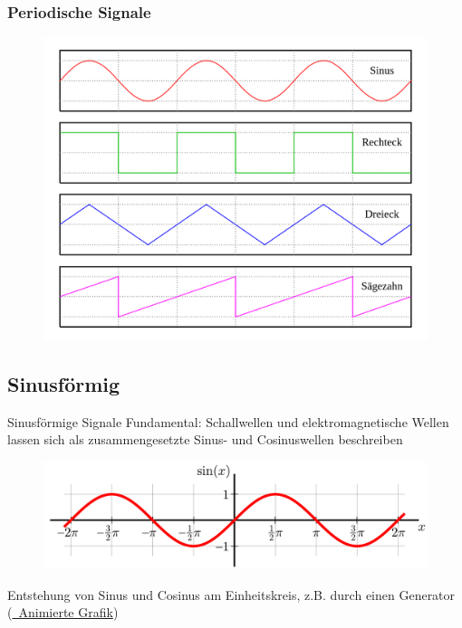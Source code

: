 \begin{frame}
  \frametitle{Periodische Signale}

  \begin{center}
    \begin{figure}
      \includegraphics[width=\textwidth,height=0.7\textheight,keepaspectratio]{a11/Waveforms_de.png}
    \end{figure}
  \end{center}

\end{frame}

\subsection{Sinusförmig}

\begin{frame}{Sinusförmige Signale}
  Fundamental: Schallwellen und elektromagnetische Wellen lassen sich als zusammengesetzte Sinus- und Cosinuswellen beschreiben

  \begin{center}
    \begin{figure}
      \includegraphics[width=\textwidth,height=.4\textheight,keepaspectratio]{a11/Sine.pdf}
    \end{figure}
  \end{center}

  Entstehung von Sinus und Cosinus am Einheitskreis, z.B. durch einen Generator (\href{https://upload.wikimedia.org/wikipedia/commons/9/9c/Einheitskreis_mit_Sinus_und_Kosinusfunktion.gif}{\ExternalLink~Animierte Grafik})

\end{frame}

